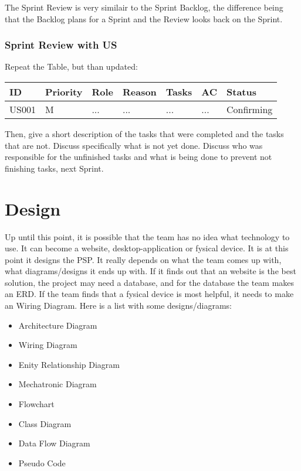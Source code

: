 \documentclass[10pt]{report}
\begin{document}
The Sprint Review is very similair to the Sprint Backlog, the difference being that the Backlog plans for a Sprint and the Review looks back on the Sprint.

\subsection{Sprint Review with US}

Repeat the Table, but than updated: 

\medskip
\begin{tabularx}{0.8\textwidth} { 
  | >{\raggedright\arraybackslash}X 
  | >{\centering\arraybackslash}X 
  | >{\raggedright\arraybackslash}X 
  | >{\raggedright\arraybackslash}X 
  | >{\raggedright\arraybackslash}X 
  | >{\raggedright\arraybackslash}X 
  | >{\raggedleft\arraybackslash}X | }
 \hline
 ID & Priority & Role & Reason & Tasks & AC & Status \\
 \hline
 US001 & M & ... & ... & ... & ... & Confirming \\
 \hline
\end{tabularx}
\medskip

\noindent Then, give a short description of the tasks that were completed and the tasks that are not. Discuss specifically what is not yet done. Discuss who was responsible for the unfinished tasks and what is being done to prevent not finishing tasks, next Sprint.

\newpage

\chapter{Design}
\thispagestyle{fancy}

Up until this point, it is possible that the team has no idea what technology to use. It can become a website, desktop-application or fysical device. It is at this point it designs the PSP. It really depends on what the team comes up with, what diagrams/designs it ends up with. If it finds out that an website is the best solution, the project may need a database, and for the database the team makes an ERD. If the team finds that a fysical device is most helpful, it needs to make an Wiring Diagram. Here is a list with some designs/diagrams:

\begin{itemize}
	\item Architecture Diagram
	\item Wiring Diagram
	\item Enity Relationship Diagram
	\item Mechatronic Diagram
	\item Flowchart
	\item Class Diagram
	\item Data Flow Diagram
	\item Pseudo Code
\end{itemize}
\end{document}
